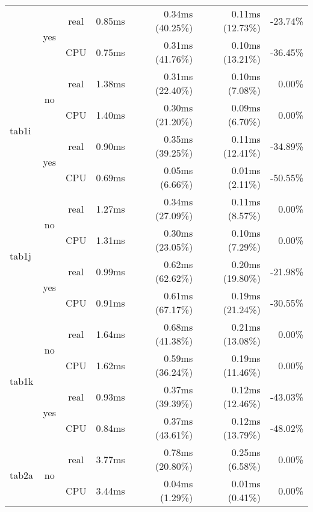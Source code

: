 \documentclass[en]{pracamgr}
\begin{document}
\begin{appendices}
\begin{small}
\begin{longtable}{|l|c|c|r|r|r|r|}
                          \cline{2-7}
                          & \multirow{2}{*}{yes} & real & 0.85ms & 0.34ms (40.25\%) & 0.11ms (12.73\%) & -23.74\% \\*
                          &                      & CPU  & 0.75ms & 0.31ms (41.76\%) & 0.10ms (13.21\%) & -36.45\% \\
\hline
\multirow{4}{*}{tab1i}    & \multirow{2}{*}{no}  & real & 1.38ms & 0.31ms (22.40\%) & 0.10ms (7.08\%) & 0.00\% \\*
                          &                      & CPU  & 1.40ms & 0.30ms (21.20\%) & 0.09ms (6.70\%) & 0.00\% \\*
                          \cline{2-7}
                          & \multirow{2}{*}{yes} & real & 0.90ms & 0.35ms (39.25\%) & 0.11ms (12.41\%) & -34.89\% \\*
                          &                      & CPU  & 0.69ms & 0.05ms (6.66\%) & 0.01ms (2.11\%) & -50.55\% \\
\hline
\multirow{4}{*}{tab1j}    & \multirow{2}{*}{no}  & real & 1.27ms & 0.34ms (27.09\%) & 0.11ms (8.57\%) & 0.00\% \\*
                          &                      & CPU  & 1.31ms & 0.30ms (23.05\%) & 0.10ms (7.29\%) & 0.00\% \\*
                          \cline{2-7}
                          & \multirow{2}{*}{yes} & real & 0.99ms & 0.62ms (62.62\%) & 0.20ms (19.80\%) & -21.98\% \\*
                          &                      & CPU  & 0.91ms & 0.61ms (67.17\%) & 0.19ms (21.24\%) & -30.55\% \\
\hline
\multirow{4}{*}{tab1k}    & \multirow{2}{*}{no}  & real & 1.64ms & 0.68ms (41.38\%) & 0.21ms (13.08\%) & 0.00\% \\*
                          &                      & CPU  & 1.62ms & 0.59ms (36.24\%) & 0.19ms (11.46\%) & 0.00\% \\*
                          \cline{2-7}
                          & \multirow{2}{*}{yes} & real & 0.93ms & 0.37ms (39.39\%) & 0.12ms (12.46\%) & -43.03\% \\*
                          &                      & CPU  & 0.84ms & 0.37ms (43.61\%) & 0.12ms (13.79\%) & -48.02\% \\
\hline
\multirow{4}{*}{tab2a}    & \multirow{2}{*}{no}  & real & 3.77ms & 0.78ms (20.80\%) & 0.25ms (6.58\%) & 0.00\% \\*
                          &                      & CPU  & 3.44ms & 0.04ms (1.29\%) & 0.01ms (0.41\%) & 0.00\% \\*

\end{longtable}
\end{small}
\end{appendices}
\end{document}
